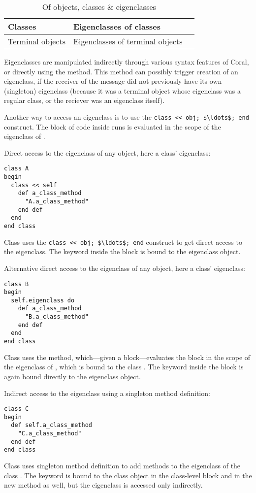 \begin{table}[ht]
  \centering
  \caption{Of objects, classes \& eigenclasses}
  \renewcommand{\arraystretch}{1.7}
  \begin{tabular}{ | >{\centering}m{3.5cm} | >{\centering}m{3.5cm} | >{\centering\arraybackslash}m{6cm} | }
  	\hline
    Classes & Eigenclasses of classes & \multirow{2}{*}{Eigenclasses of eigenclasses} \\ \cline{1-2}
    Terminal objects & Eigenclasses of terminal objects & \\
    \hline
  \end{tabular}
\end{table}

Eigenclasses are manipulated indirectly through various syntax features of Coral, or directly using the  method. This method can possibly trigger creation of an eigenclass, if the receiver of the  message did not previously have its own (singleton) eigenclass (because it was a terminal object whose eigenclass was a regular class, or the reciever was an eigenclass itself). 

Another way to access an eigenclass is to use the \lstinline!class << obj; $\ldots$; end! construct. The block of code inside runs is evaluated in the scope of the eigenclass of . 

\example Direct access to the eigenclass of any object, here a class' eigenclass:
\begin{lstlisting}
class A
begin
  class << self
    def a_class_method
      "A.a_class_method"
    end def
  end
end class
\end{lstlisting}
Class  uses the \lstinline!class << obj; $\ldots$; end! construct to get direct access to the eigenclass. The keyword  inside the block is bound to the eigenclass object. 

\example Alternative direct access to the eigenclass of any object, here a class' eigenclass:
\begin{lstlisting}
class B
begin
  self.eigenclass do
    def a_class_method
      "B.a_class_method"
    end def
  end
end class
\end{lstlisting}
Class  uses the  method, which---given a block---evaluates the block in the scope of the eigenclass of , which is bound to the class . The keyword  inside the block is again bound directly to the eigenclass object. 

\example Indirect access to the eigenclass using a singleton method definition:
\begin{lstlisting}
class C
begin
  def self.a_class_method
    "C.a_class_method"
  end def
end class
\end{lstlisting}
Class  uses singleton method definition to add methods to the eigenclass of the class . The keyword  is bound to the class object in the class-level block and in the new method as well, but the eigenclass is accessed only indirectly. 

